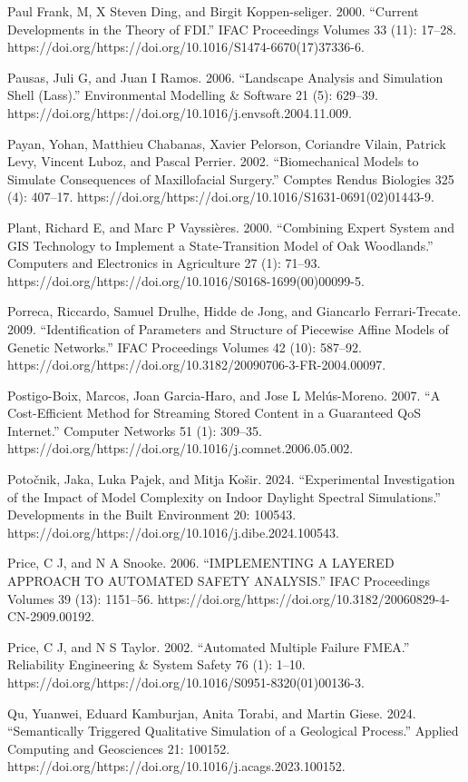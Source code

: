 \documentclass[utf8]{gradu3}
\begin{document}
Paul Frank, Μ, X Steven Ding, and Birgit Koppen-seliger. 2000. “Current Developments in the Theory of FDI.” IFAC Proceedings Volumes 33 (11): 17–28. https://doi.org/https://doi.org/10.1016/S1474-6670(17)37336-6.

Pausas, Juli G, and Juan I Ramos. 2006. “Landscape Analysis and Simulation Shell (Lass).” Environmental Modelling \& Software 21 (5): 629–39. https://doi.org/https://doi.org/10.1016/j.envsoft.2004.11.009.

Payan, Yohan, Matthieu Chabanas, Xavier Pelorson, Coriandre Vilain, Patrick Levy, Vincent Luboz, and Pascal Perrier. 2002. “Biomechanical Models to Simulate Consequences of Maxillofacial Surgery.” Comptes Rendus Biologies 325 (4): 407–17. https://doi.org/https://doi.org/10.1016/S1631-0691(02)01443-9.

Plant, Richard E, and Marc P Vayssières. 2000. “Combining Expert System and GIS Technology to Implement a State-Transition Model of Oak Woodlands.” Computers and Electronics in Agriculture 27 (1): 71–93. https://doi.org/https://doi.org/10.1016/S0168-1699(00)00099-5.

Porreca, Riccardo, Samuel Drulhe, Hidde de Jong, and Giancarlo Ferrari-Trecate. 2009. “Identification of Parameters and Structure of Piecewise Affine Models of Genetic Networks.” IFAC Proceedings Volumes 42 (10): 587–92. https://doi.org/https://doi.org/10.3182/20090706-3-FR-2004.00097.

Postigo-Boix, Marcos, Joan Garcia-Haro, and Jose L Melús-Moreno. 2007. “A Cost-Efficient Method for Streaming Stored Content in a Guaranteed QoS Internet.” Computer Networks 51 (1): 309–35. https://doi.org/https://doi.org/10.1016/j.comnet.2006.05.002.

Potočnik, Jaka, Luka Pajek, and Mitja Košir. 2024. “Experimental Investigation of the Impact of Model Complexity on Indoor Daylight Spectral Simulations.” Developments in the Built Environment 20: 100543. https://doi.org/https://doi.org/10.1016/j.dibe.2024.100543.

Price, C J, and N A Snooke. 2006. “IMPLEMENTING A LAYERED APPROACH TO AUTOMATED SAFETY ANALYSIS.” IFAC Proceedings Volumes 39 (13): 1151–56. https://doi.org/https://doi.org/10.3182/20060829-4-CN-2909.00192.

Price, C J, and N S Taylor. 2002. “Automated Multiple Failure FMEA.” Reliability Engineering \& System Safety 76 (1): 1–10. https://doi.org/https://doi.org/10.1016/S0951-8320(01)00136-3.

Qu, Yuanwei, Eduard Kamburjan, Anita Torabi, and Martin Giese. 2024. “Semantically Triggered Qualitative Simulation of a Geological Process.” Applied Computing and Geosciences 21: 100152. https://doi.org/https://doi.org/10.1016/j.acags.2023.100152.
\end{document}
